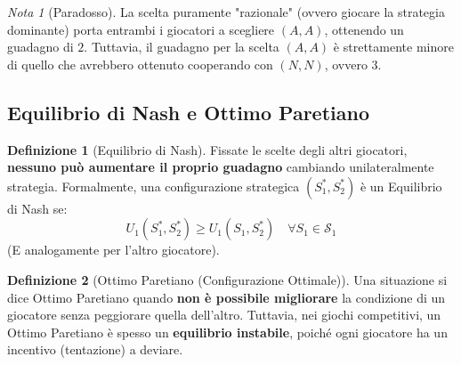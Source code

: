 \documentclass[openany]{book}
\theoremstyle{definition}
\newtheorem*{definizione}{Definizione}
\theoremstyle{remark}
\newtheorem*{nota}{Nota}
\begin{document}
\begin{nota}[Paradosso]
La scelta puramente "razionale" (ovvero giocare la strategia dominante) porta entrambi i giocatori a scegliere $(A,A)$, ottenendo un guadagno di $2$. Tuttavia, il guadagno per la scelta $(A,A)$ è strettamente minore di quello che avrebbero ottenuto cooperando con $(N,N)$, ovvero $3$.
\end{nota}

\subsection*{Equilibrio di Nash e Ottimo Paretiano}

\begin{definizione}[Equilibrio di Nash]
Fissate le scelte degli altri giocatori, \textbf{nessuno può aumentare il proprio guadagno} cambiando unilateralmente strategia. 
Formalmente, una configurazione strategica $(S_1^*, S_2^*)$ è un Equilibrio di Nash se:
\begin{equation}
    U_1(S_1^*, S_2^*) \ge U_1(S_1, S_2^*) \quad \forall S_1 \in \mathcal{S}_1
\end{equation}
(E analogamente per l'altro giocatore).
\end{definizione}

\begin{definizione}[Ottimo Paretiano (Configurazione Ottimale)]
Una situazione si dice Ottimo Paretiano quando \textbf{non è possibile migliorare} la condizione di un giocatore senza peggiorare quella dell'altro. Tuttavia, nei giochi competitivi, un Ottimo Paretiano è spesso un \textbf{equilibrio instabile}, poiché ogni giocatore ha un incentivo (tentazione) a deviare.
\end{definizione}
\end{document}
